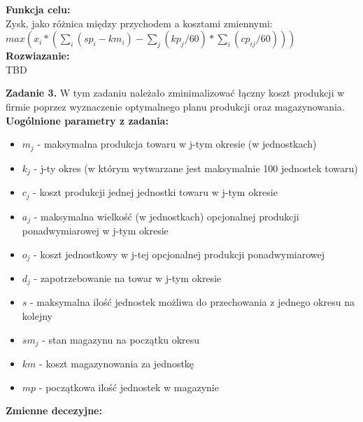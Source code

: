 \documentclass[15pt, a4paper]{article}
\begin{document}
\noindent\textbf{Funkcja celu:}\\

Zysk, jako różnica między przychodem a kosztami zmiennymi:\\ \(max( x_{i} * ( \sum_{i}( sp_i - km_{i} ) - \sum_{j}(kp_j / 60) * \sum_{i}(cp_{ij} / 60)  ))\)\\

\noindent\textbf{Rozwiazanie:}\\ 

TBD

\vspace{0.5cm}

\noindent\hrulefill

\vspace{0.5cm}


\noindent\textbf{Zadanie 3.} W tym zadaniu należało zminimalizować łączny koszt produkcji w firmie poprzez wyznaczenie optymalnego planu produkcji oraz magazynowania.\\

\noindent\textbf{Uogólnione parametry z zadania:}

\begin{itemize}
    \item \( m_j \) - maksymalna produkcja towaru w j-tym okresie (w jednostkach)
    \item \( k_j \) - j-ty okres (w którym wytwarzane jest maksymalnie 100 jednostek towaru)
    \item \( c_j \) - koszt produkcji jednej jednostki towaru w j-tym okresie
    \item \( a_j \) - maksymalna wielkość (w jednostkach) opcjonalnej produkcji ponadwymiarowej w j-tym okresie
    \item \( o_j \) - koszt jednostkowy w j-tej opcjonalnej produkcji ponadwymiarowej
    \item \( d_j \) - zapotrzebowanie na towar w j-tym okresie
    \item \( s \) - maksymalna ilość jednostek możliwa do przechowania z jednego okresu na kolejny
    \item \( sm_j \) - stan magazynu na początku okresu
    \item \( km \) - koszt magazynowania za jednostkę 
    \item \( mp \) - początkowa ilość jednostek w magazynie
\end{itemize}

\noindent\textbf{Zmienne decezyjne:}
\end{document}
